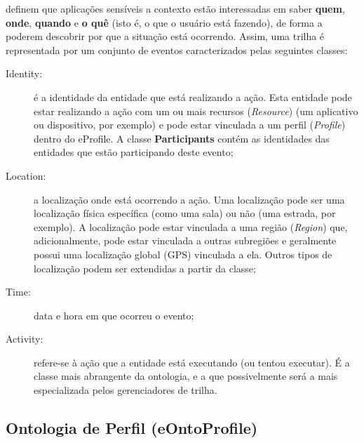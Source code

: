  definem que aplicações sensíveis a contexto estão interessadas em saber {\bf quem}, {\bf onde}, {\bf quando} e {\bf o quê} (isto é, o que o usuário está fazendo), de forma a poderem descobrir por que a situação está ocorrendo. Assim, uma trilha é representada por um conjunto de eventos caracterizados pelas seguintes classes:

\begin{description}

  \item[Identity:] é a identidade da entidade que está realizando a ação. Esta entidade pode estar realizando a ação com um ou mais recursos ({\em Resource}) (um aplicativo ou dispositivo, por exemplo) e pode estar vinculada a um perfil ({\em Profile}) dentro do eProfile. A classe \textbf{Participants} contém as identidades das entidades que estão participando deste evento;

  \item[Location:] a localização onde está ocorrendo a ação. Uma localização pode ser uma localização física específica (como uma sala) ou não (uma estrada, por exemplo). A localização pode estar vinculada a uma região ({\em Region}) que, adicionalmente, pode estar vinculada a outras subregiões e geralmente possui uma localização global (GPS) vinculada a ela. Outros tipos de localização podem ser extendidas a partir da classe;

  \item[Time:] data e hora em que ocorreu o evento;

  \item[Activity:] refere-se à ação que a entidade está executando (ou tentou executar). É a classe mais abrangente da ontologia, e a que possivelmente será a mais especializada pelos gerenciadores de trilha.

\end{description}



\subsection{Ontologia de Perfil (eOntoProfile)}
\label{sec:eontoprofile}

